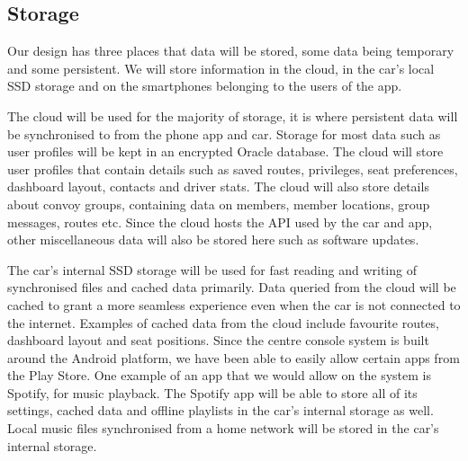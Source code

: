 \documentclass{article}
\begin{document}

\subsection{Storage}\label{ssec:storage} %
Our design has three places that data will be stored, some data being temporary and some persistent. We will store information in the cloud, in the car's local SSD storage and on the smartphones belonging to the users of the app.

The cloud will be used for the majority of storage, it is where persistent data will be synchronised to from the phone app and car. Storage for most data such as user profiles will be kept in an encrypted Oracle database. The cloud will store user profiles that contain details such as saved routes, privileges, seat preferences, dashboard layout, contacts and driver stats. The cloud will also store details about convoy groups, containing data on members, member locations, group messages, routes etc. Since the cloud hosts the API used by the car and app, other miscellaneous data will also be stored here such as software updates.

The car's internal SSD storage will be used for fast reading and writing of synchronised files and cached data primarily. Data queried from the cloud will be cached to grant a more seamless experience even when the car is not connected to the internet. Examples of cached data from the cloud include favourite routes, dashboard layout and seat positions. Since the centre console system is built around the Android platform, we have been able to easily allow certain apps from the Play Store. One example of an app that we would allow on the system is Spotify, for music playback. The Spotify app will be able to store all of its settings, cached data and offline playlists in the car's internal storage as well. Local music files synchronised from a home network will be stored in the car's internal storage.
\end{document}
